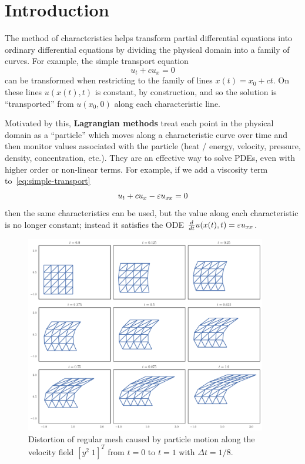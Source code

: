 \chapter{Introduction}

The method of characteristics helps transform partial differential equations
into ordinary differential equations by dividing the physical domain into
a family of curves. For example, the simple transport equation
\begin{equation}\label{eq:simple-transport}
u_t + c u_x = 0
\end{equation}
can be transformed when restricting to the family of lines
\(x(t) = x_0 + c t\). On these lines \(u(x(t), t)\) is constant, by
construction, and so the solution is ``transported'' from \(u(x_0, 0)\)
along each characteristic line.

Motivated by this, \textbf{Lagrangian methods} treat each point in the
physical domain as a ``particle'' which moves along a characteristic curve
over time and then monitor values associated with the particle (heat / energy,
velocity, pressure, density, concentration, etc.). They are an effective way
to solve PDEs, even with higher order or non-linear terms.
For example, if we add a viscosity term to~\eqref{eq:simple-transport}
\begin{equation}
u_t + c u_x - \varepsilon u_{xx} = 0
\end{equation}
then the same characteristics can be used, but the value
along each characteristic is no longer constant; instead it satisfies the
ODE \(\frac{d}{dt} u(x(t), t) = \varepsilon u_{xx}\).

\begin{figure}
  \includegraphics[width=0.9375\textwidth]
                  {../images/curved-mesh/mesh_distortion.pdf}
  \centering
  \caption{Distortion of regular mesh caused by particle motion along
    the velocity field \(\left[ y^2 \; 1 \right]^T\) from \(t = 0\)
    to \(t = 1\) with \(\Delta t = 1/8\).}
  \label{fig:mesh-distortion}
\end{figure}

